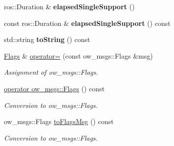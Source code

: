\begin{DoxyCompactItemize}
\item 
ros\+::\+Duration \& {\bfseries elapsed\+Single\+Support} ()\hypertarget{classow__core_1_1Flags_a162caa75d6465b975bdb8b95d8b80589}{}\label{classow__core_1_1Flags_a162caa75d6465b975bdb8b95d8b80589}

\item 
const ros\+::\+Duration \& {\bfseries elapsed\+Single\+Support} () const \hypertarget{classow__core_1_1Flags_a9ca36b0e1a1f328c91f105d9fd07863a}{}\label{classow__core_1_1Flags_a9ca36b0e1a1f328c91f105d9fd07863a}

\item 
std\+::string {\bfseries to\+String} () const \hypertarget{classow__core_1_1Flags_a6d8e6f26edbf82e50aeadff4c53e9b0b}{}\label{classow__core_1_1Flags_a6d8e6f26edbf82e50aeadff4c53e9b0b}

\item 
\hyperlink{classow__core_1_1Flags}{Flags} \& \hyperlink{classow__core_1_1Flags_a1321c0d5946adc5d64ab0211988969e9}{operator=} (const ow\+\_\+msgs\+::\+Flags \&msg)\hypertarget{classow__core_1_1Flags_a1321c0d5946adc5d64ab0211988969e9}{}\label{classow__core_1_1Flags_a1321c0d5946adc5d64ab0211988969e9}

\begin{DoxyCompactList}\small\item\em Assignment of ow\+\_\+msgs\+::\+Flags. \end{DoxyCompactList}\item 
\hyperlink{classow__core_1_1Flags_af95a736d7cae3b7c5a181616cc1de4db}{operator ow\+\_\+msgs\+::\+Flags} () const \hypertarget{classow__core_1_1Flags_af95a736d7cae3b7c5a181616cc1de4db}{}\label{classow__core_1_1Flags_af95a736d7cae3b7c5a181616cc1de4db}

\begin{DoxyCompactList}\small\item\em Conversion to ow\+\_\+msgs\+::\+Flags. \end{DoxyCompactList}\item 
ow\+\_\+msgs\+::\+Flags \hyperlink{classow__core_1_1Flags_a9a92cd2206164a7e0fe7cd198f0fb6f6}{to\+Flags\+Msg} () const \hypertarget{classow__core_1_1Flags_a9a92cd2206164a7e0fe7cd198f0fb6f6}{}\label{classow__core_1_1Flags_a9a92cd2206164a7e0fe7cd198f0fb6f6}

\begin{DoxyCompactList}\small\item\em Conversion to ow\+\_\+msgs\+::\+Flags. \end{DoxyCompactList}\end{DoxyCompactItemize}
